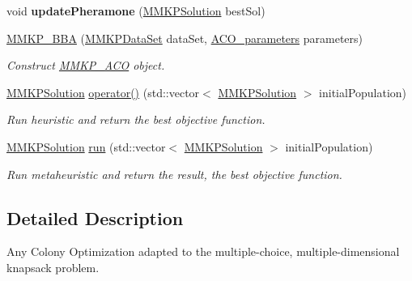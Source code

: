\begin{DoxyCompactItemize}
\item 
\hypertarget{class_m_m_k_p___a_c_o_af91feee9d55d2e7e3806a595227b3e54}{void {\bfseries update\+Pheramone} (\hyperlink{class_m_m_k_p_solution}{M\+M\+K\+P\+Solution} best\+Sol)}\label{class_m_m_k_p___a_c_o_af91feee9d55d2e7e3806a595227b3e54}

\item 
\hyperlink{class_m_m_k_p___a_c_o_a98b2e704011d525172ed48ed8f114fa5}{M\+M\+K\+P\+\_\+\+B\+B\+A} (\hyperlink{class_m_m_k_p_data_set}{M\+M\+K\+P\+Data\+Set} data\+Set, \hyperlink{class_a_c_o__parameters}{A\+C\+O\+\_\+parameters} parameters)
\begin{DoxyCompactList}\small\item\em Construct \hyperlink{class_m_m_k_p___a_c_o}{M\+M\+K\+P\+\_\+\+A\+C\+O} object. \end{DoxyCompactList}\item 
\hyperlink{class_m_m_k_p_solution}{M\+M\+K\+P\+Solution} \hyperlink{class_m_m_k_p___a_c_o_a0d8af29cc503c3f97788af97611d64ae}{operator()} (std\+::vector$<$ \hyperlink{class_m_m_k_p_solution}{M\+M\+K\+P\+Solution} $>$ initial\+Population)
\begin{DoxyCompactList}\small\item\em Run heuristic and return the best objective function. \end{DoxyCompactList}\item 
\hypertarget{class_m_m_k_p___a_c_o_ab2625fe1df6ac86a20f50e6bb684019a}{\hyperlink{class_m_m_k_p_solution}{M\+M\+K\+P\+Solution} \hyperlink{class_m_m_k_p___a_c_o_ab2625fe1df6ac86a20f50e6bb684019a}{run} (std\+::vector$<$ \hyperlink{class_m_m_k_p_solution}{M\+M\+K\+P\+Solution} $>$ initial\+Population)}\label{class_m_m_k_p___a_c_o_ab2625fe1df6ac86a20f50e6bb684019a}

\begin{DoxyCompactList}\small\item\em Run metaheuristic and return the result, the best objective function. \end{DoxyCompactList}\end{DoxyCompactItemize}


\subsection{Detailed Description}
Any Colony Optimization adapted to the multiple-\/choice, multiple-\/dimensional knapsack problem. 


